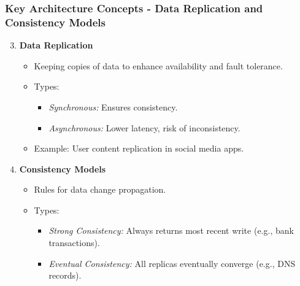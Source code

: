 \documentclass[aspectratio=169]{beamer}
\begin{document}
\begin{frame}[fragile]
  \frametitle{Key Architecture Concepts - Data Replication and Consistency Models}
  \begin{enumerate}
    \setcounter{enumi}{2} %
    \item \textbf{Data Replication}
      \begin{itemize}
        \item Keeping copies of data to enhance availability and fault tolerance.
        \item Types:
          \begin{itemize}
            \item \textit{Synchronous:} Ensures consistency.
            \item \textit{Asynchronous:} Lower latency, risk of inconsistency.
          \end{itemize}
        \item Example: User content replication in social media apps.
      \end{itemize}
    
    \item \textbf{Consistency Models}
      \begin{itemize}
        \item Rules for data change propagation.
        \item Types:
          \begin{itemize}
            \item \textit{Strong Consistency:} Always returns most recent write (e.g., bank transactions).
            \item \textit{Eventual Consistency:} All replicas eventually converge (e.g., DNS records).
          \end{itemize}
      \end{itemize}
  \end{enumerate}
\end{frame}
\end{document}
